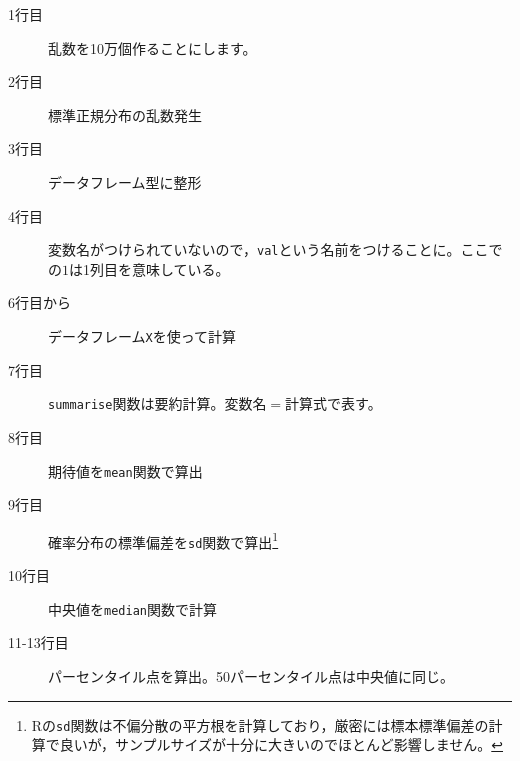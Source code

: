 \begin{description}
	\item[1行目] 乱数を10万個作ることにします。
	\item[2行目] 標準正規分布の乱数発生
	\item[3行目] データフレーム型に整形
	\item[4行目] 変数名がつけられていないので，\texttt{val}という名前をつけることに。ここでの$1$は1列目を意味している。
	\item[6行目から] データフレーム\texttt{X}を使って計算
	\item[7行目] \texttt{summarise}関数は要約計算。変数名$=$計算式で表す。
	\item[8行目] 期待値を\texttt{mean}関数で算出
	\item[9行目] 確率分布の標準偏差を\texttt{sd}関数で算出\footnote{Rの\texttt{sd}関数は不偏分散の平方根を計算しており，厳密には標本標準偏差の計算で良いが，サンプルサイズが十分に大きいのでほとんど影響しません。}
	\item[10行目] 中央値を\texttt{median}関数で計算
	\item[11-13行目] パーセンタイル点を算出。50パーセンタイル点は中央値に同じ。
\end{description}
